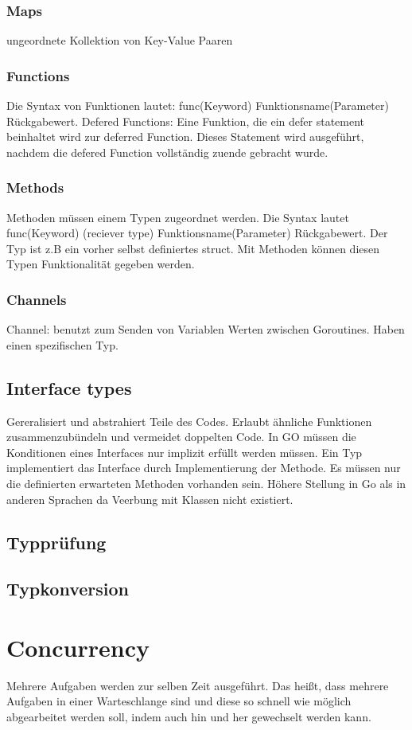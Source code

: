 \subsubsection{Maps}
ungeordnete Kollektion von Key-Value Paaren
\subsubsection{Functions}
Die Syntax von Funktionen lautet: func(Keyword) Funktionsname(Parameter) Rückgabewert.
Defered Functions: Eine Funktion, die ein defer statement beinhaltet wird zur deferred Function. Dieses Statement wird ausgeführt, nachdem die defered Function vollständig zuende gebracht wurde.
\subsubsection{Methods}
Methoden müssen einem Typen zugeordnet werden. Die Syntax lautet  func(Keyword) (reciever type) Funktionsname(Parameter) Rückgabewert. Der Typ ist z.B ein vorher selbst definiertes struct. Mit Methoden können diesen Typen Funktionalität gegeben werden.
\subsubsection{Channels}
Channel: benutzt zum Senden von Variablen Werten zwischen Goroutines. Haben einen spezifischen Typ.

\subsection{Interface types}
Gereralisiert und abstrahiert Teile des Codes. Erlaubt ähnliche Funktionen zusammenzubündeln und vermeidet doppelten Code. In GO müssen die Konditionen eines Interfaces nur implizit erfüllt werden müssen. Ein Typ implementiert das Interface durch Implementierung der Methode. Es müssen nur die definierten erwarteten Methoden vorhanden sein. Höhere Stellung in Go als in anderen Sprachen da Veerbung mit Klassen nicht existiert.
\subsection{Typprüfung}
\subsection{Typkonversion}


\section{Concurrency}
Mehrere Aufgaben werden zur selben Zeit ausgeführt. Das heißt, dass mehrere Aufgaben in einer Warteschlange sind und diese so schnell wie möglich abgearbeitet werden soll, indem auch hin und her gewechselt werden kann. 
